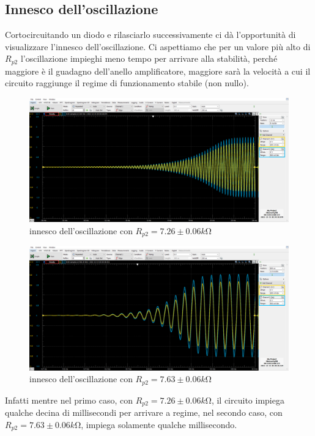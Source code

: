 \documentclass[10pt, a4paper, italian]{article}
\begin{document}
\subsection{Innesco dell'oscillazione}
Cortocircuitando un diodo e rilasciarlo successivamente ci dà l'opportunità di visualizzare l'innesco dell'oscillazione. Ci aspettiamo che per un valore più alto di $R_{p2}$ l'oscillazione impieghi meno tempo per arrivare alla stabilità, perché maggiore è il guadagno dell'anello amplificatore, maggiore sarà la velocità a cui il circuito raggiunge il regime di funzionamento stabile (non nullo).
\begin{figure}[H]
    \centering
	\includegraphics[scale=0.4]{5.7.26}
    \caption{innesco dell'oscillazione con $R_{p2}=7.26 \pm 0.06 \si{k\ohm}$
    \label{fig: Draft1}}
\end{figure}
\begin{figure}[H]
    \centering
	\includegraphics[scale=0.4]{5.7.63}
    \caption{innesco dell'oscillazione con $R_{p2}=7.63 \pm 0.06 \si{k\ohm}$
    \label{fig: Draft1}}
\end{figure}
Infatti mentre nel primo caso, con $R_{p2}=7.26 \pm 0.06 \si{k\ohm}$, il circuito impiega qualche decina di millisecondi per arrivare a regime, nel secondo caso, con $R_{p2}=7.63 \pm 0.06 \si{k\ohm}$, impiega solamente qualche millisecondo.
\end{document}

